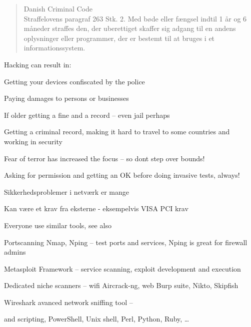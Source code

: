 \documentclass[Screen16to9,17pt]{foils}
\begin{document}
\begin{quote}\small
Danish Criminal Code\\
Straffelovens paragraf 263 Stk. 2. Med bøde eller fængsel indtil 1 år og 6 måneder straffes den, der uberettiget skaffer sig adgang til en andens oplysninger eller programmer, der er bestemt til at bruges i et informationssystem.
\end{quote}

Hacking can result in:
\begin{list2}
\item Getting your devices confiscated by the police
\item Paying damages to persons or businesses
\item If older getting a fine and a record -- even jail perhaps
\item Getting a criminal record, making it hard to travel to some countries and working in security
\item Fear of terror has increased the focus -- so dont step over bounds!
\end{list2}

Asking for permission and getting an OK before doing invasive tests, always!



\begin{list1}
\item Sikkerhedsproblemer i netværk er mange
\item Kan være et krav fra eksterne - eksempelvis VISA PCI krav
\end{list1}




\begin{list2}
\item Everyone use similar tools, see also 
\item Portscanning Nmap, Nping -- test ports and services, Nping is great for firewall admins 
\item Metasploit Framework -- service scanning, exploit development and execution 
\item Dedicated niche scanners -- wifi Aircrack-ng, web Burp suite, Nikto, Skipfish 
\item Wireshark avanced network sniffing tool -- 
\item and scripting, PowerShell, Unix shell, Perl, Python, Ruby, \ldots
\end{list2}
\end{document}

